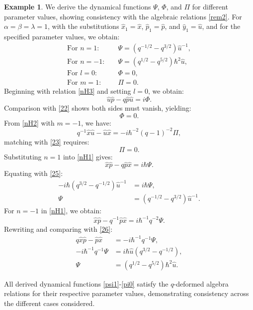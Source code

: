 \documentclass[12pt,a4paper]{article}
\theoremstyle{plain}
\theoremstyle{definition}
\newtheorem{example}[theorem]{Example}
\theoremstyle{remark}
\begin{document}
\begin{example}
We derive the dynamical functions $\Psi$, $\Phi$, and $\Pi$ for different parameter values, showing consistency with the algebraic relations \eqref{rem2}. For $\alpha = \beta = \lambda = 1$, with the substitutions \( \hat{x}_{1}=\hat{x}\), \( \hat{p}_{1}= \hat{p} \), and \( \hat{y}_{1}=\hat{u} \), and for the specified parameter values, we obtain:
\begin{align}
\text{For } n = 1:& \quad \Psi = (q^{-1/2} - q^{3/2})\hat{u}^{-1}, \label{psi1} \\
\text{For } n = -1:& \quad \Psi = (q^{1/2} - q^{5/2})\hbar^{2}\hat{u} \label{psi2}, \\
\text{For } l = 0:& \quad \Phi = 0 \label{phi0}, \\
\text{For } m = 1:& \quad \Pi = 0 \label{pi0}.
\end{align}
Beginning with relation \eqref{nH3} and setting $l = 0$, we obtain:
\begin{equation*}
\hat{u}\hat{p} - q\hat{p}\hat{u} = i\Phi .\label{eq:phi}
\end{equation*}
Comparison with \eqref{22} shows both sides must vanish, yielding:
\begin{equation}
\Phi = 0.
\end{equation}
From \eqref{nH2} with $m = -1$, we have:
\begin{equation*}
q^{-1}\hat{x}\hat{u} - \hat{u}\hat{x} = -i\hbar^{-2}(q-1)^{-2}\Pi ,\label{eq:pi}
\end{equation*}
matching with \eqref{23} requires:
\begin{equation*}
\Pi = 0.
\end{equation*}
Substituting $n = 1$ into \eqref{nH1} gives:
\begin{equation}
\hat{x}\hat{p} - q\hat{p}\hat{x} = i\hbar\Psi .\label{eq:psi1}
\end{equation}
Equating with \eqref{25}:
\begin{align*}
-i\hbar (q^{3/2} - q^{-1/2})\hat{u}^{-1} &= i\hbar\Psi , \\
\Psi &= (q^{-1/2} - q^{3/2})\hat{u}^{-1}.
\end{align*}
For $n = -1$ in \eqref{nH1}, we obtain:
\begin{equation*}
\hat{x}\hat{p} - q^{-1}\hat{p}\hat{x} = i\hbar^{-1}q^{-2}\Psi .\label{eq:psi2}
\end{equation*}
Rewriting and comparing with \eqref{26}:
\begin{align*}
q\hat{x}\hat{p} - \hat{p}\hat{x} &= -i\hbar^{-1}q^{-1}\Psi  ,\\
-i\hbar^{-1}q^{-1}\Psi &= i\hbar\hat{u}(q^{3/2} - q^{-1/2}), \\
\Psi &= (q^{1/2} - q^{5/2})\hbar^{2}\hat{u}.
\end{align*}

All derived dynamical functions \eqref{psi1}-\eqref{pi0} satisfy the $q$-deformed algebra relations for their respective parameter values, demonstrating consistency across the different cases considered.
\end{example}
\end{document}
